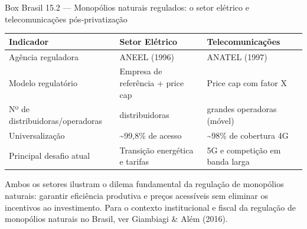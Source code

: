 \documentclass[11pt,twoside,openright]{book}
\begin{document}
\begin{boxbrasilbox}{Box Brasil 15.2 — Monopólios naturais regulados: o setor elétrico e telecomunicações pós-privatização}
{\def\LTcaptype{none} %
\begin{longtable}[]{@{}
  >{\raggedright\arraybackslash}p{}
  >{\raggedright\arraybackslash}p{}
  >{\raggedright\arraybackslash}p{}@{}}
\toprule\noalign{}
\begin{minipage}[b]{\linewidth}\raggedright
Indicador
\end{minipage} & \begin{minipage}[b]{\linewidth}\raggedright
Setor Elétrico
\end{minipage} & \begin{minipage}[b]{\linewidth}\raggedright
Telecomunicações
\end{minipage} \\
\midrule\noalign{}
\endhead
\bottomrule\noalign{}
\endlastfoot
Agência reguladora & ANEEL (1996) & ANATEL (1997) \\
Modelo regulatório & Empresa de referência + price cap & Price cap com
fator X \\
Nº de distribuidoras/operadoras & 53 distribuidoras & 3 grandes
operadoras (móvel) \\
Universalização & \textasciitilde99,8\% de acesso & \textasciitilde98\%
de cobertura 4G \\
Principal desafio atual & Transição energética e tarifas & 5G e
competição em banda larga \\
\end{longtable}
}

Ambos os setores ilustram o dilema fundamental da regulação de
monopólios naturais: garantir eficiência produtiva e preços acessíveis
sem eliminar os incentivos ao investimento. Para o contexto
institucional e fiscal da regulação de monopólios naturais no Brasil,
ver Giambiagi \& Além (2016).

\end{boxbrasilbox}
\end{document}
